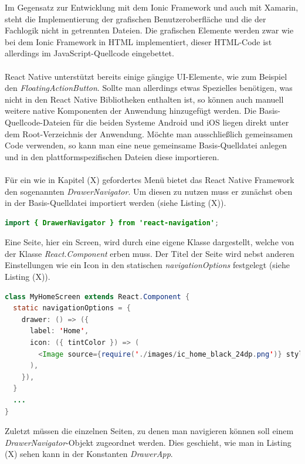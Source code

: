 Im Gegensatz zur Entwicklung mit dem Ionic Framework und auch mit Xamarin, steht die Implementierung der grafischen Benutzeroberfläche und die der Fachlogik nicht in getrennten Dateien. Die grafischen Elemente werden zwar wie bei dem Ionic Framework in HTML implementiert, dieser HTML-Code ist allerdings im JavaScript-Quellcode eingebettet. 
\\
\\
React Native unterstützt bereits einige gängige UI-Elemente, wie zum Beispiel den \textit{FloatingActionButton}. Sollte man allerdings etwas Spezielles benötigen, was nicht in den React Native Bibliotheken enthalten ist, so können auch manuell weitere native Komponenten der Anwendung hinzugefügt werden. Die Basis-Quellcode-Dateien für die beiden Systeme Android und iOS liegen direkt unter dem Root-Verzeichnis der Anwendung. Möchte man ausschließlich gemeinsamen Code verwenden, so kann man eine neue gemeinsame Basis-Quelldatei anlegen und in den plattformspezifischen Dateien diese importieren. 
\\
\\
Für ein wie in Kapitel (X) gefordertes Menü bietet das React Native Framework den sogenannten \textit{DrawerNavigator}. Um diesen zu nutzen muss er zunächst oben in der Basis-Quelldatei importiert werden (siehe Listing (X)).

\begin{lstlisting}[caption=Import der Klasse \textit{DrawerNavigator} für das Menü in React Native, label=lst:ImportDrawerNavigator, language=Java]
import { DrawerNavigator } from 'react-navigation';
\end{lstlisting}

Eine Seite, hier ein Screen, wird durch eine eigene Klasse dargestellt, welche von der Klasse \textit{React.Component} erben muss. Der Titel der Seite wird nebst anderen Einstellungen wie ein Icon in den statischen \textit{navigationOptions} festgelegt (siehe Listing (X)).

\begin{lstlisting}[caption=Festlegen des Seitentitels, label=lst:SeitentitelReactNative, language=Java]
class MyHomeScreen extends React.Component {
  static navigationOptions = {
    drawer: () => ({
      label: 'Home',
      icon: ({ tintColor }) => (
        <Image source={require('./images/ic_home_black_24dp.png')} style={[styles.icon, {tintColor: tintColor}]}/>
      ),
    }),
  }
  ...
}
\end{lstlisting}

Zuletzt müssen die einzelnen Seiten, zu denen man navigieren können soll einem \textit{DrawerNavigator}-Objekt zugeordnet werden. Dies geschieht, wie man in Listing (X) sehen kann in der Konstanten \textit{DrawerApp}. 
\clearpage

